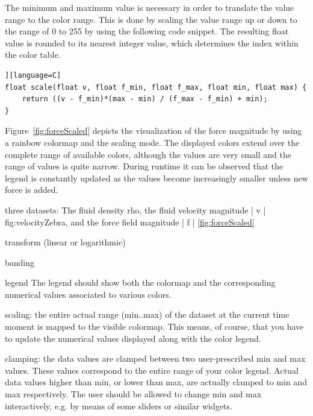 The minimum and maximum value is necessary in order to translate the value range to the color range. This is done by scaling the value range up or down to the range of 0 to 255 by using the following code snippet. The resulting float value is rounded to its nearest integer value, which determines the index within the color table. 

\begin{lstlisting}][language=C]
float scale(float v, float f_min, float f_max, float min, float max) {
    return ((v - f_min)*(max - min) / (f_max - f_min) + min);
}
\end{lstlisting}

Figure~\ref{fig:forceScaled} depicts the visualization of the force magnitude by using a rainbow colormap and the scaling mode. The displayed colors extend over the complete range of available colors, although the values are very small and the range of values is quite narrow. During runtime it can be observed that the legend is constantly updated as the values become increasingly smaller unless new force is added. 








three datasets: The fluid density rho, the fluid velocity magnitude | v | fig:velocityZebra, and the force field magnitude | f | \ref{fig:forceScaled}



 


transform (linear or logarithmic)

banding 

legend  The legend should show both the colormap and the corresponding numerical values associated to various colors.

scaling: the entire actual range (min..max) of the dataset at the current time moment is mapped to the visible colormap. This means, of course, that you have to update the numerical values displayed along with the color legend.


clamping: the data values are clamped between two user-prescribed min and max values. These values correspond to the entire range of your color legend. Actual data values higher than min, or lower than max, are actually clamped to min and max respectively. The user should be allowed to change min and max interactively, e.g. by means of some sliders or similar widgets.
 



